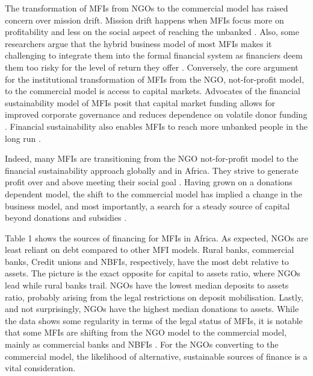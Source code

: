 \documentclass[a4paper, nobind]{templates/ociamthesis}
\begin{document}
The transformation of MFIs from NGOs to the commercial model has raised concern over mission drift. Mission drift happens when MFIs focus more on profitability and less on the social aspect of reaching the unbanked \autocite{mia2017mission,ramus2017stakeholders}. Also, some researchers argue that the hybrid business model of most MFIs makes it challenging to integrate them into the formal financial system as financiers deem them too risky for the level of return they offer \autocite{campion1999institutional}. Conversely, the core argument for the institutional transformation of MFIs from the NGO, not-for-profit model, to the commercial model is access to capital markets. Advocates of the financial sustainability model of MFIs posit that capital market funding allows for improved corporate governance and reduces dependence on volatile donor funding \autocite{garmaise2013cheap,armendariz2013subsidy}. Financial sustainability also enables MFIs to reach more unbanked people in the long run \autocite{tchakoute2010there}.

Indeed, many MFIs are transitioning from the NGO not-for-profit model to the financial sustainability approach globally and in Africa. They strive to generate profit over and above meeting their social goal \autocite{hudon2010management,wagenaar2012institutional,kodongo2013individual}. Having grown on a donations dependent model, the shift to the commercial model has implied a change in the business model, and most importantly, a search for a steady source of capital beyond donations and subsidies \autocite{armendariz2013subsidy}.

Table 1 shows the sources of financing for MFIs in Africa. As expected, NGOs are least reliant on debt compared to other MFI models. Rural banks, commercial banks, Credit unions and NBFIs, respectively, have the most debt relative to assets. The picture is the exact opposite for capital to assets ratio, where NGOs lead while rural banks trail. NGOs have the lowest median deposits to assets ratio, probably arising from the legal restrictions on deposit mobilisation. Lastly, and not surprisingly, NGOs have the highest median donations to assets. While the data shows some regularity in terms of the legal status of MFIs, it is notable that some MFIs are shifting from the NGO model to the commercial model, mainly as commercial banks and NBFIs \autocite{sarma2011ngo,jia2016commercialization}. For the NGOs converting to the commercial model, the likelihood of alternative, sustainable sources of finance is a vital consideration.
\end{document}
